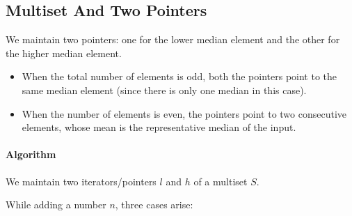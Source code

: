 \subsection{Multiset And Two Pointers}

We maintain two pointers: one for the lower median element and the other for the higher median element. 

\begin{itemize}
\item When the total number of elements is odd, both the pointers point to the same median element (since there is only one median in this case). 

\item When the number of elements is even, the pointers point to two consecutive elements, whose mean is the representative median of the input.
\end{itemize}

\paragraph{Algorithm}
We maintain two iterators/pointers $l$ and $h$ of a multiset $S$.

While adding a number $n$, three cases arise:

